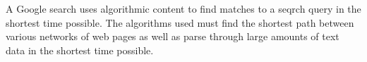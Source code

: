
A Google search uses algorithmic content to find matches to a seqrch query in the
shortest time possible. The algorithms used must find the shortest path between
various networks of web pages as well as parse through large amounts of text
data in the shortest time possible.
